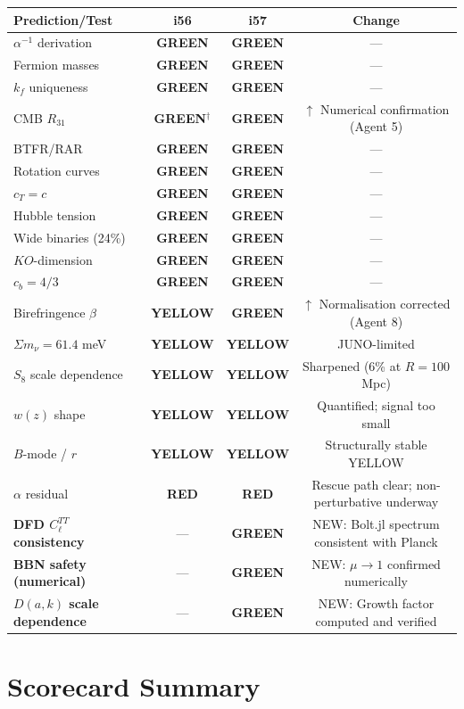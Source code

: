\documentclass[11pt,a4paper]{article}
\newcommand{\GREEN}{\textcolor{dfdgreen}{\textbf{GREEN}}}
\newcommand{\YELLOW}{\textcolor{dfdyellow}{\textbf{YELLOW}}}
\newcommand{\RED}{\textcolor{dfdred}{\textbf{RED}}}
\begin{document}
\begin{center}
\begin{longtable}{p{5cm}ccc}
\toprule
\textbf{Prediction/Test} & \textbf{i56} & \textbf{i57} & \textbf{Change} \\
\midrule
$\alpha^{-1}$ derivation & \GREEN & \GREEN & --- \\
Fermion masses & \GREEN & \GREEN & --- \\
$k_f$ uniqueness & \GREEN & \GREEN & --- \\
CMB $R_{31}$ & \GREEN$^\dagger$ & \GREEN & $\uparrow$ Numerical confirmation (Agent 5) \\
BTFR/RAR & \GREEN & \GREEN & --- \\
Rotation curves & \GREEN & \GREEN & --- \\
$c_T = c$ & \GREEN & \GREEN & --- \\
Hubble tension & \GREEN & \GREEN & --- \\
Wide binaries (24\%) & \GREEN & \GREEN & --- \\
$KO$-dimension & \GREEN & \GREEN & --- \\
$c_b = 4/3$ & \GREEN & \GREEN & --- \\
Birefringence $\beta$ & \YELLOW & \GREEN & $\uparrow$ Normalisation corrected (Agent 8) \\
$\Sigma m_\nu = 61.4$ meV & \YELLOW & \YELLOW & JUNO-limited \\
$S_8$ scale dependence & \YELLOW & \YELLOW & Sharpened (6\% at $R = 100$ Mpc) \\
$w(z)$ shape & \YELLOW & \YELLOW & Quantified; signal too small \\
$B$-mode / $r$ & \YELLOW & \YELLOW & Structurally stable YELLOW \\
$\alpha$ residual & \RED & \RED & Rescue path clear; non-perturbative underway \\
\midrule
\textbf{DFD $C_\ell^{TT}$ consistency} & --- & \GREEN & NEW: Bolt.jl spectrum consistent with Planck \\
\textbf{BBN safety (numerical)} & --- & \GREEN & NEW: $\mu \to 1$ confirmed numerically \\
\textbf{$D(a,k)$ scale dependence} & --- & \GREEN & NEW: Growth factor computed and verified \\
\bottomrule
\end{longtable}
\end{center}

\section{Scorecard Summary}
\end{document}
